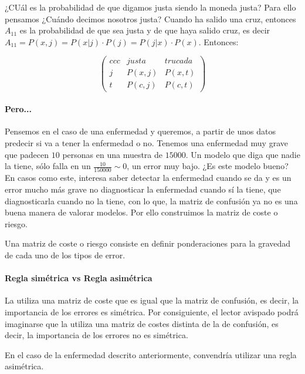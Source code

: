 \documentclass{apuntes}
\begin{document}
¿CUál es la probabilidad de que digamos justa siendo la moneda justa? Para ello pensamos ¿Cuándo decimos nosotros justa? Cuando ha salido una cruz, entonces $A_{11}$ es la probabilidad de que sea justa y de que haya salido cruz, es decir $A_{11} = P(x,j) = P(x|j)·P(j) = P(j|x)·P(x)$. Entonces:

\[
\begin{pmatrix}{ccc}
& justa & trucada \\\hline
j& P(x,j) & P(x,t)\\
t& P(c,j) & P(c,t)
\end{pmatrix}
\]




\paragraph{Pero...}

Pensemos en el caso de una enfermedad y queremos, a partir de unos datos predecir si va a tener la enfermedad o no. Tenemos una enfermedad muy grave que padecen $10$ personas en una muestra de $15000$. Un modelo que diga que nadie la tiene, sólo falla en un $\frac{10}{150000} \sim 0$, un error muy bajo. ¿Es este modelo bueno? En casos como este, interesa saber detectar la enfermedad cuando se da y es un error mucho más grave no diagnosticar la enfermedad cuando sí la tiene, que diagnosticarla cuando no la tiene, con lo que, la matriz de confusión ya no es una buena manera de valorar modelos. Por ello construimos la matriz de coste o riesgo.

\begin{defn}
	Una matriz de coste o riesgo consiste en definir ponderaciones para la gravedad de cada uno de los tipos de error.
\end{defn}


\paragraph{Regla simétrica vs Regla asimétrica}
 La  utiliza una matriz de coste que es igual que la matriz de confusión, es decir, la importancia de los errores es simétrica.  Por consiguiente, el lector avispado podrá imaginarse que la  utiliza una matriz de costes distinta de la de confusión, es decir, la importancia de los errores no es simétrica.

 En el caso de la enfermedad descrito anteriormente, convendría utilizar una regla asimétrica.
\end{document}
